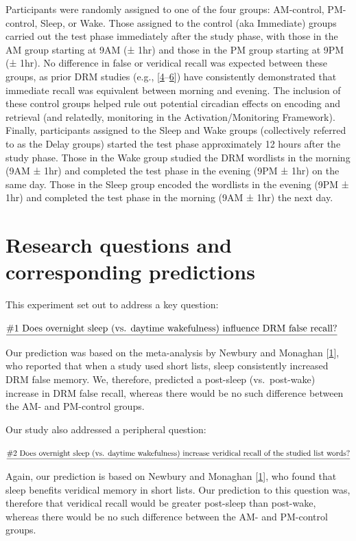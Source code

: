 \documentclass[
]{article}
\begin{document}
Participants were randomly assigned to one of the four groups: AM-control, PM-control, Sleep, or Wake. Those assigned to the control (aka Immediate) groups carried out the test phase immediately after the study phase, with those in the AM group starting at 9AM (± 1hr) and those in the PM group starting at 9PM (± 1hr). No difference in false or veridical recall was expected between these groups, as prior DRM studies (e.g., {[}\protect\hyperlink{ref-fenn2009a}{4}--\protect\hyperlink{ref-payne2009a}{6}{]}) have consistently demonstrated that immediate recall was equivalent between morning and evening. The inclusion of these control groups helped rule out potential circadian effects on encoding and retrieval (and relatedly, monitoring in the Activation/Monitoring Framework). Finally, participants assigned to the Sleep and Wake groups (collectively referred to as the Delay groups) started the test phase approximately 12 hours after the study phase. Those in the Wake group studied the DRM wordlists in the morning (9AM ± 1hr) and completed the test phase in the evening (9PM ± 1hr) on the same day. Those in the Sleep group encoded the wordlists in the evening (9PM ± 1hr) and completed the test phase in the morning (9AM ± 1hr) the next day.

\hypertarget{research-questions-and-corresponding-predictions}{%
\section{Research questions and corresponding predictions}\label{research-questions-and-corresponding-predictions}}

This experiment set out to address a key question:

\(\text{\underline{\#1 Does overnight sleep (vs. daytime wakefulness) influence DRM false recall?}}\)

Our prediction was based on the meta-analysis by Newbury and Monaghan {[}\protect\hyperlink{ref-newbury2019a}{1}{]}, who reported that when a study used short lists, sleep consistently increased DRM false memory. We, therefore, predicted a post-sleep (vs.~post-wake) increase in DRM false recall, whereas there would be no such difference between the AM- and PM-control groups.

Our study also addressed a peripheral question:

\(\text{\underline{\#2 Does overnight sleep (vs. daytime wakefulness) increase veridical recall of the studied list words?}}\)

Again, our prediction is based on Newbury and Monaghan {[}\protect\hyperlink{ref-newbury2019a}{1}{]}, who found that sleep benefits veridical memory in short lists. Our prediction to this question was, therefore that veridical recall would be greater post-sleep than post-wake, whereas there would be no such difference between the AM- and PM-control groups.
\end{document}
